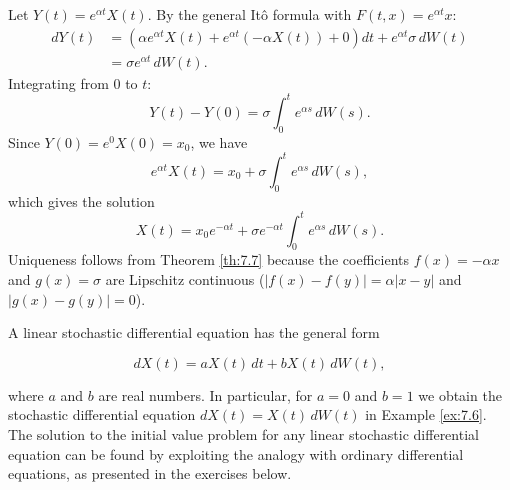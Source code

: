 \begin{Solution}
Let $Y(t) = e^{\alpha t} X(t)$. By the general Itô formula with $F(t, x) = e^{\alpha t} x$:
\begin{align*}
dY(t) &= \left( \alpha e^{\alpha t} X(t) + e^{\alpha t} (-\alpha X(t)) + 0 \right) dt + e^{\alpha t} \sigma \, dW(t) \\
&= \sigma e^{\alpha t} \, dW(t).
\end{align*}
Integrating from $0$ to $t$:
\begin{equation*}
Y(t) - Y(0) = \sigma \int_0^t e^{\alpha s} \, dW(s).
\end{equation*}
Since $Y(0) = e^0 X(0) = x_0$, we have
\begin{equation*}
e^{\alpha t} X(t) = x_0 + \sigma \int_0^t e^{\alpha s} \, dW(s),
\end{equation*}
which gives the solution
\begin{equation*}
X(t) = x_0 e^{-\alpha t} + \sigma e^{-\alpha t} \int_0^t e^{\alpha s} \, dW(s).
\end{equation*}
Uniqueness follows from Theorem \ref{th:7.7} because the coefficients $f(x) = -\alpha x$ and $g(x) = \sigma$ are Lipschitz continuous ($|f(x) - f(y)| = \alpha |x - y|$ and $|g(x) - g(y)| = 0$).
\end{Solution}


A linear stochastic differential equation has the general form

\begin{equation}
dX(t) = a X(t) \, dt + b X(t) \, dW(t),
\label{eq:linear_SDE}
\end{equation}

where $a$ and $b$ are real numbers. In particular, for $a = 0$ and $b = 1$ we obtain the stochastic differential equation $dX(t) = X(t) \, dW(t)$ in Example \ref{ex:7.6}. The solution to the initial value problem for any linear stochastic differential equation can be found by exploiting the analogy with ordinary differential equations, as presented in the exercises below.

